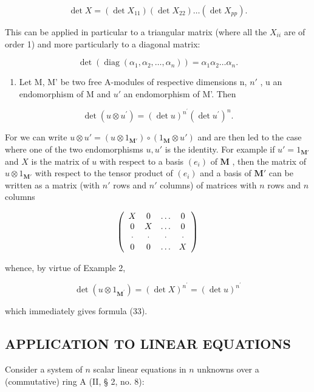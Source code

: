 \[
\det X = (\det X _ {1 1}) (\det X _ {2 2}) \dots (\det X _ {p p}).
\]

This can be applied in particular to a triangular matrix (where all the \(X_{ii}\) are of order 1) and more particularly to a diagonal matrix:

\[
\det (\operatorname{diag} \left(\alpha_ {1}, \alpha_ {2}, \dots , \alpha_ {n}\right)) = \alpha_ {1} \alpha_ {2} \dots \alpha_ {n}.\tag{32}
\]

\begin{enumerate}
\def\labelenumi{(\arabic{enumi})}
\setcounter{enumi}{2}
\tightlist
\item
  Let M, M' be two free A-modules of respective dimensions n, \(n'\) , u an endomorphism of M and \(u'\) an endomorphism of M'. Then
\end{enumerate}

\[
\det (u \otimes u ^ {\prime}) = (\det u) ^ {n ^ {\prime}} (\det u ^ {\prime}) ^ {n}.\tag{33}
\]

For we can write \(u \otimes u' = (u \otimes 1_{\mathbf{M}'}) \circ (1_{\mathbf{M}} \otimes u')\) and are then led to the case where one of the two endomorphisms \(u, u'\) is the identity. For example if \(u' = 1_{\mathbf{M}'}\) and \(X\) is the matrix of \(u\) with respect to a basis \((e_i)\) of \(\mathbf{M}\) , then the matrix of \(u \otimes 1_{\mathbf{M}'}\) with respect to the tensor product of \((e_i)\) and a basis of \(\mathbf{M}'\) can be written as a matrix (with \(n'\) rows and \(n'\) columns) of matrices with \(n\) rows and \(n\) columns

\[
\left( \begin{array}{c c c c} X & 0 & \ldots & 0 \\ 0 & X & \ldots & 0 \\ \cdot & \cdot & \cdot & \cdot \\ 0 & 0 & \ldots & X \end{array} \right)
\]

whence, by virtue of Example 2,

\[
\det (u \otimes 1 _ {\mathbf {M} ^ {\prime}}) = (\det X) ^ {n ^ {\prime}} = (\det u) ^ {n ^ {\prime}}
\]

which immediately gives formula (33).

\subsection{APPLICATION TO LINEAR EQUATIONS}

Consider a system of \(n\) scalar linear equations in \(n\) unknowns over a (commutative) ring A (II, § 2, no. 8):

